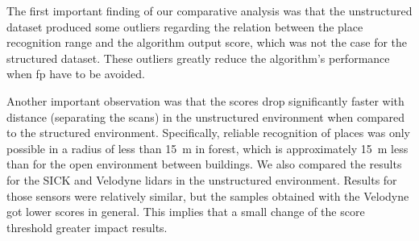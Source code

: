 The first important finding of our comparative analysis was that the unstructured dataset produced some outliers regarding the relation between the place recognition range and the algorithm output score, which was not the case for the structured dataset. These outliers greatly reduce the algorithm's performance when \gls*{fp} have to be avoided.

Another important observation was that the scores drop significantly faster with distance (separating the scans) in the unstructured environment when compared to the structured environment. Specifically, reliable recognition of places was only possible in a radius of less than \SI{15}{\meter} in forest, which is approximately \SI{15}{\meter} less than for the open environment between buildings. We also compared the results for the SICK and Velodyne \gls*{lidar}s in the unstructured environment. Results for those sensors were relatively similar, but the samples obtained with the Velodyne got lower scores in general. This implies that a small change of the score threshold greater impact results. 

